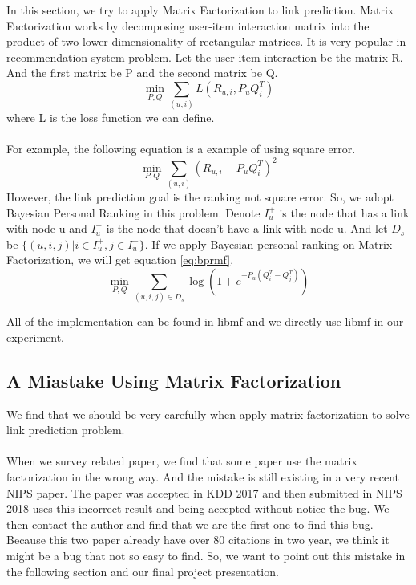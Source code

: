 \documentclass[12pt]{article}
\begin{document}
In this section, we try to apply Matrix Factorization to link prediction. Matrix Factorization works by decomposing user-item interaction matrix into the product of two lower dimensionality of rectangular matrices. It is very popular in recommendation system problem. Let the user-item interaction be the matrix R. And the first matrix be P and the second matrix be Q.  
\\
\begin{equation}
\min_{P,Q}{\sum_{(u,i)}{L(R_{u,i}, P_uQ_i^T)}}
\end{equation}
where L is the loss function we can define. \\
\\
For example, the following equation is a example of using square error. \\
\begin{equation}
\min_{P,Q}{\sum_{(u,i)}{(R_{u,i}-P_uQ_i^T)^2}}
\end{equation}
However, the link prediction goal is the ranking not square error. So, we adopt Bayesian Personal Ranking\cite{bpr} in this problem. Denote $I_u^+$ is the node that has a link with node u and $I_u^-$ is the node that doesn't have a link with node u. And let $D_s$ be $\{(u,i,j)|i \in I_u^+, j \in I_u^-\}$. If we apply Bayesian personal ranking on Matrix Factorization, we will get equation \ref{eq:bprmf}.
\begin{equation}
\min_{P,Q} \sum_{(u,i,j)\in D_s}\log(1+e^{-P_u(Q_i^T - Q_j^T)})
\label{eq:bprmf}
\end{equation}

All of the implementation can be found in libmf\cite{libmf} and we directly use libmf in our experiment.

\subsection{A Miastake Using Matrix Factorization}
We find that we should be very carefully when apply matrix factorization to solve link prediction problem.
\\ \\
When we survey related paper, we find that some paper use the matrix factorization in the wrong way. And the mistake is still existing in a very recent NIPS paper. The paper was accepted in KDD 2017 and then submitted in NIPS 2018 uses this incorrect result and being accepted without notice the bug. We then contact the author and  find that we are the first one to find this bug. Because this two paper already have over 80 citations in two year, we think it might be a bug that not so easy to find. So, we want to point out this mistake in the following section and our final project presentation.   
\end{document}
